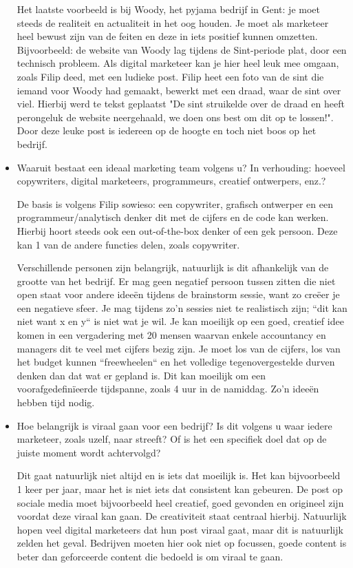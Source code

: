 \begin{itemize}
	Het laatste voorbeeld is bij Woody, het pyjama bedrijf in Gent: je moet steeds de realiteit en actualiteit in het oog houden. Je moet als marketeer heel bewust zijn van de feiten en deze in iets positief kunnen omzetten. Bijvoorbeeld: de website van Woody lag tijdens de Sint-periode plat, door een technisch probleem. Als digital marketeer kan je hier heel leuk mee omgaan, zoals Filip deed, met een ludieke post. Filip heet een foto van de sint die iemand voor Woody had gemaakt, bewerkt met een draad, waar de sint over viel. Hierbij werd te tekst geplaatst "De sint struikelde over de draad en heeft perongeluk de website neergehaald, we doen ons best om dit op te lossen!". Door deze leuke post is iedereen op de hoogte en toch niet boos op het bedrijf.
	
	\item Waaruit bestaat een ideaal marketing team volgens u? In verhouding: hoeveel copywriters, digital marketeers, programmeurs, creatief ontwerpers, enz.?
	
	De basis is volgens Filip sowieso: een copywriter, grafisch ontwerper en een programmeur/analytisch denker dit met de cijfers en de code kan werken. Hierbij hoort steeds ook een out-of-the-box denker of een gek persoon. Deze kan 1 van de andere functies delen, zoals copywriter.	
	
	Verschillende personen zijn belangrijk, natuurlijk is dit afhankelijk van de grootte van het bedrijf. Er mag geen negatief persoon tussen zitten die niet open staat voor andere ideeën tijdens de brainstorm sessie, want zo creëer je een negatieve sfeer. Je mag tijdens zo'n sessies niet te realistisch zijn; ``dit kan niet want x en y`` is niet wat je wil. Je kan moeilijk op een goed, creatief idee komen in een vergadering met 20 mensen waarvan enkele accountancy en managers dit te veel met cijfers bezig zijn. Je moet los van de cijfers, los van het budget kunnen ``freewheelen`` en het volledige tegenovergestelde durven denken dan dat wat er gepland is. Dit kan moeilijk om een voorafgedefinïeerde tijdspanne, zoals 4 uur in de namiddag. Zo'n ideeën hebben tijd nodig.
	
	\item Hoe belangrijk is viraal gaan voor een bedrijf? Is dit volgens u waar iedere marketeer, zoals uzelf, naar streeft? Of is het een specifiek doel dat op de juiste moment wordt achtervolgd?
	
Dit gaat natuurlijk niet altijd en is iets dat moeilijk is. Het kan bijvoorbeeld 1 keer per jaar, maar het is niet iets dat consistent kan gebeuren. De post op sociale media moet bijvoorbeeld heel creatief, goed gevonden en origineel zijn voordat deze viraal kan gaan. De creativiteit staat centraal hierbij. Natuurlijk hopen veel digital marketeers dat hun post viraal gaat, maar dit is natuurlijk zelden het geval. Bedrijven moeten hier ook niet op focussen, goede content is beter dan geforceerde content die bedoeld is om viraal te gaan.


\end{itemize}
